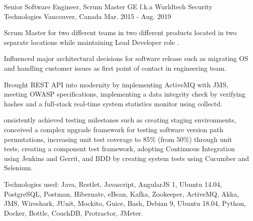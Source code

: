 \begin{cventries}
  \cventry
    {Senior Software Engineer, Scrum Master} %
    {GE f.k.a Wurldtech Security Technologies} %
    {Vancouver, Canada} %
    {Mar. 2015 - Aug. 2019} %
    {
      \begin{cvitems} %
        \item {Scrum Master for two different teams in two different products located in two separate locations while maintaining Lead Developer role .}
        \item {Influenced major architectural decisions for software release such as migrating OS and handling customer issues as first point of contact in engineering team.}
        \item {Brought REST API into modernity by implementing ActiveMQ
        with JMS, meeting OWASP specifications, implementing a data integrity check by verifying hashes and a full-stack real-time system statistics monitor using collectd.}
        \item {onsistently achieved testing milestones such as creating staging environments, conceived a complex upgrade framework for testing software version path permutations, increasing unit test coverage to 85\% (from 50\%) through unit tests, creating a component test framework, adopting Continuous Integration using Jenkins and Gerrit, and BDD by creating system tests using Cucumber and Selenium. }
        \item {Technologies used: Java, Restlet, Javascript, AngularJS 1, Ubuntu 14.04, PostgreSQL, Postman, Hibernate, eBean, Kafka, Zookeeper, ActiveMQ, Akka, JMS, Wireshark, JUnit, Mockito, Guice, Bash, Debian 9, Ubuntu 18.04, Python, Docker, Bottle, CouchDB, Protractor, JMeter.}
      \end{cvitems}
    }


\end{cventries}
